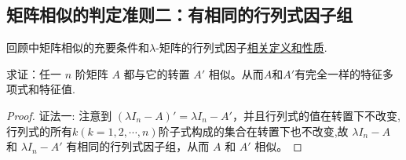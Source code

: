 \documentclass[../../main.tex]{subfiles}
\begin{document}
\subsection{矩阵相似的判定准则二：有相同的行列式因子组}

回顾中矩阵相似的充要条件和$\lambda$-矩阵的行列式因子\hyperref[lemma:i阶行列式因子整除i+1阶行列式因子]{相关定义和性质}.

\begin{proposition}[矩阵必与其转置相似]\label{proposition:lambda-矩阵一定与其转置相似}
求证：任一 $n$ 阶矩阵 $A$ 都与它的转置 $A'$ 相似。从而$A$和$A'$有完全一样的特征多项式和特征值.
\end{proposition}
\begin{proof}
{\color{blue} 证法一:}
注意到 $(\lambda I_n - A)' = \lambda I_n - A'$，并且行列式的值在转置下不改变,行列式的所有$k(k=1,2,\cdots,n)$阶子式构成的集合在转置下也不改变,故 $\lambda I_n - A$ 和 $\lambda I_n - A'$ 有相同的行列式因子组，从而 $A$ 和 $A'$ 相似。


\end{proof}
\end{document}
